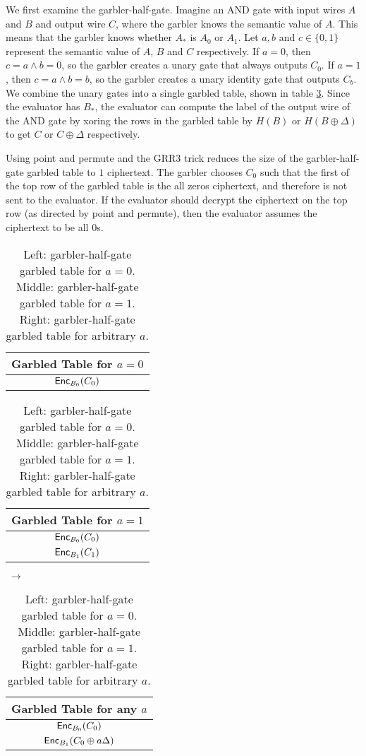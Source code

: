 We first examine the garbler-half-gate.
Imagine an AND gate with input wires $A$ and $B$ and output wire $C$, where the garbler knows the semantic value of $A$.
This means that the garbler knows whether $A_*$ is $A_0$ or $A_1$.
Let $a,b$ and $c \in \{0,1\}$ represent the semantic value of $A$, $B$ and $C$ respectively.
If $a = 0$, then $c = a \wedge b = 0$, so the garbler creates a unary gate that always outputs $C_0$.
If $a = 1$, then $c = a \wedge b = b$, so the garbler creates a unary identity gate that outputs $C_b$.
We combine the unary gates into a single garbled table, shown in table \ref{tbl:halfgate-gg-garb}.
Since the evaluator has $B_*$, the evaluator can compute the label of the output wire of the AND gate by xoring the rows in the garbled table by $H(B)$ or $H(B \oplus \Delta)$ to get $C$ or $C \oplus \Delta$ respectively. 

Using point and permute and the GRR3 trick reduces the size of the garbler-half-gate garbled table to $1$ ciphertext.
The garbler chooses $C_0$ such that the first of the top row of the garbled table is the all zeros ciphertext, and therefore is not sent to the evaluator.
If the evaluator should decrypt the ciphertext on the top row (as directed by point and permute), then the evaluator assumes the ciphertext to be all 0s.

\begin{table}[]
    \label{tbl:halfgate-gg-garb}
    \centering
    \begin{tabular}{|c|}
        \hline
        Garbled Table for $a = 0$ \\
        \hline
        $\textsf{Enc}_{B_0}(C_0)$ \\
        \hline
    \end{tabular}
    \begin{tabular}{|c|}
        \hline
        Garbled Table for $a = 1$ \\
        \hline
        $\textsf{Enc}_{B_0}(C_0)$ \\
        $\textsf{Enc}_{B_1}(C_1)$ \\
        \hline
    \end{tabular} $\;\rightarrow$
    \begin{tabular}{|c|}
        \hline
        Garbled Table for any $a$ \\
        \hline
        $\textsf{Enc}_{B_0}(C_0)$ \\
        $\textsf{Enc}_{B_1}(C_0 \oplus a\Delta)$ \\
        \hline
    \end{tabular}
    \caption{Left: garbler-half-gate garbled table for $a = 0$. Middle: garbler-half-gate garbled table for $a = 1$. Right: garbler-half-gate garbled table for arbitrary $a$.}
\end{table}

